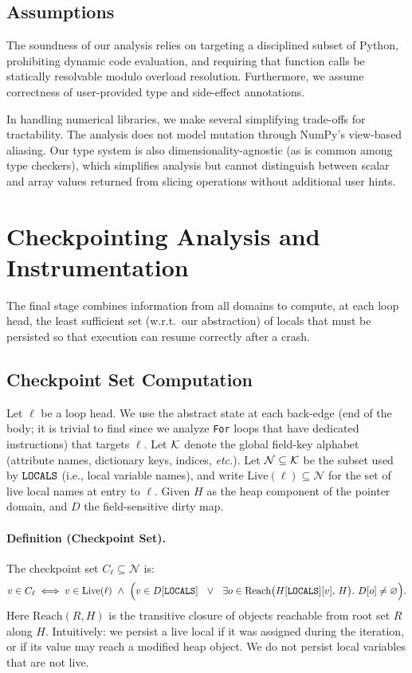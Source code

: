 \subsection{Assumptions}
\label{sec:assumptions}
The soundness of our analysis relies on targeting a disciplined subset of Python, prohibiting dynamic code evaluation, and requiring that function calls be statically resolvable modulo overload resolution. Furthermore, we assume correctness of user-provided type and side-effect annotations.

In handling numerical libraries, we make several simplifying trade-offs for tractability. The analysis does not model mutation through NumPy's view-based aliasing. Our type system is also dimensionality-agnostic (as is common among type checkers), which simplifies analysis but cannot distinguish between scalar and array values returned from slicing operations without additional user hints.

\section{Checkpointing Analysis and Instrumentation}
\label{sec:checkpoint-analysis}

The final stage combines information from all domains to compute, at each loop head, the least sufficient set (w.r.t.\ our abstraction) of locals that must be persisted so that execution can resume correctly after a crash.

\subsection{Checkpoint Set Computation}

Let $\ell$ be a loop head. We use the abstract state at each back-edge (end of the body; it is trivial to find since we analyze \lstinline{For} loops that have dedicated instructions) that targets $\ell$.
Let $\mathcal{K}$ denote the global field-key alphabet (attribute names, dictionary keys, indices, \emph{etc.}).
Let $\mathcal{N}\subseteq\mathcal{K}$ be the subset used by $\texttt{LOCALS}$ (i.e., local variable names), and write $\text{Live}(\ell)\subseteq\mathcal{N}$ for the set of live local names at entry to $\ell$.
Given $H$ as the heap component of the pointer domain, and $D$ the field-sensitive dirty map.

\paragraph{Definition (Checkpoint Set).}
The checkpoint set $C_\ell\subseteq\mathcal{N}$ is:
\[
v\in C_\ell \iff v\in \text{Live}(\ell)\ \wedge\
\Big( v\in D[\texttt{LOCALS}] \ \ \lor\ \ \exists o\in \text{Reach}\big(H[\texttt{LOCALS}][v],\,H\big).\ D[o]\neq\varnothing \Big).
\]
Here $\text{Reach}(R,H)$ is the transitive closure of objects reachable from root set $R$ along $H$.
Intuitively: we persist a live local if it was assigned during the iteration, or if its value may reach a modified heap object. We do not persist local variables that are not live.

